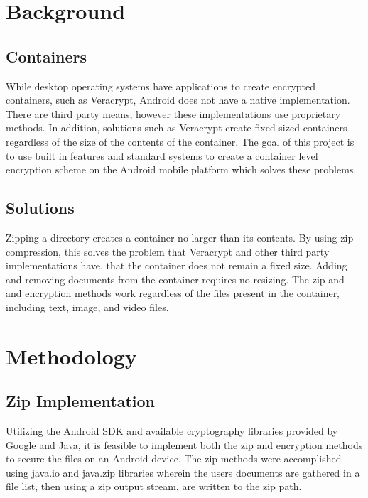 \documentclass[10pt,a4paper]{article}
\begin{document}
\section{Background}

\subsection{Containers}
While desktop operating systems have applications to create encrypted containers, such as Veracrypt, Android does not have a native implementation. There are third party means, however these implementations use proprietary methods. In addition, solutions such as Veracrypt create fixed sized containers regardless of the size of the contents of the container. The goal of this project is to use built in features and standard systems to create a container level encryption scheme on the Android mobile platform which solves these problems.

\subsection{Solutions}
Zipping a directory creates a container no larger than its contents. By using zip compression, this solves the problem that Veracrypt and other third party implementations have, that the container does not remain a fixed size. Adding and removing documents from the container requires no resizing. The zip and and encryption methods work regardless of the files present in the container, including text, image, and video files.

\section{Methodology}
\subsection{Zip Implementation}
Utilizing the Android SDK and available cryptography libraries provided by Google and Java, it is feasible to implement both the zip and encryption methods to secure the files on an Android device. The zip methods were accomplished using java.io and java.zip libraries wherein the users documents are gathered in a file list, then using a zip output stream, are written to the zip path. 
\end{document}
